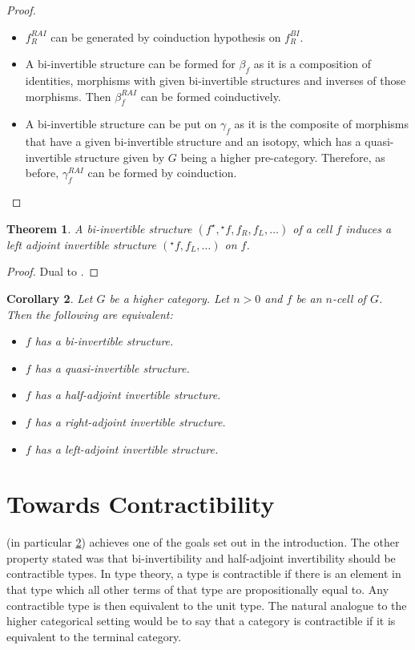 \documentclass[draft]{article}
\renewcommand{\comment}[1]{\todo[color=green!40]{#1}}
\newtheorem{theorem}{Theorem} \newtheorem{prop}[theorem]{Proposition}
\newtheorem{cor}[theorem]{Corollary}
\newcommand{\linv}[1]{{}^\star\!#1} \newcommand{\rinv}[1]{#1^\star}
\begin{document}
\begin{proof}
\begin{itemize}
\begin{center}
    \end{center}
  \item \(f_R^{RAI}\) can be generated by coinduction hypothesis on
    \(f_R^{BI}\).
  \item A bi-invertible structure can be formed for \(\beta_f\) as it
    is a composition of identities, morphisms with given bi-invertible
    structures and inverses of those morphisms. Then \(\beta_f^{RAI}\)
    can be formed coinductively.
  \item A bi-invertible structure can be put on \(\gamma_f\) as it is
    the composite of morphisms that have a given bi-invertible
    structure and an isotopy, which has a quasi-invertible structure
    given by \(G\) being a higher pre-category. Therefore, as before,
    \(\gamma_f^{RAI}\) can be formed by coinduction. \end{itemize}
\end{proof}

\begin{theorem}
  A bi-invertible structure \((\rinv f, \linv f, f_R, f_L, \dots)\) of
  a cell \(f\) induces a left adjoint invertible structure \((\linv f,
  f_L, \dots)\) on \(f\).
\end{theorem}
\begin{proof}
  Dual to .
\end{proof}

\begin{cor}\label{cor:equiv}
  Let \(G\) be a higher category. Let \(n > 0\) and \(f\) be an
  \(n\)-cell of \(G\). Then the following are equivalent:
  \begin{itemize}
  \item \(f\) has a bi-invertible structure.
  \item \(f\) has a quasi-invertible structure.
  \item \(f\) has a half-adjoint invertible structure.
  \item \(f\) has a right-adjoint invertible structure.
  \item \(f\) has a left-adjoint invertible structure.
  \end{itemize}\comment{Is this also bad?}
\end{cor}

\section{Towards Contractibility}\label{sec:contractibility}

 (in particular \cref{cor:equiv}) achieves one of the
goals set out in the introduction. The other property stated was that
bi-invertibility and half-adjoint invertibility should be contractible
types. In type theory, a type is contractible if there is an element
in that type which all other terms of that type are propositionally
equal to. Any contractible type is then equivalent to the unit type.
The natural analogue to the higher categorical setting would be to say
that a category is contractible if it is equivalent to the terminal
category.
\end{document}
